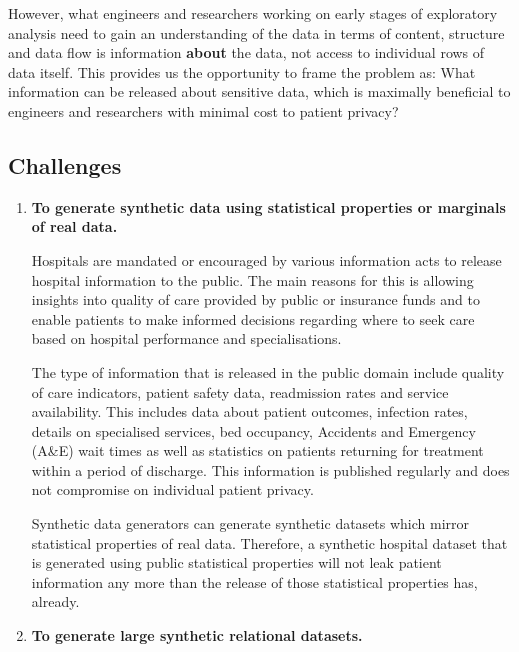 \documentclass[11pt]{article}
\begin{document}
However, what engineers and researchers working on early stages of exploratory analysis need to gain an understanding of the data in terms of content, structure and data flow is information \textbf{about} the data, not access to individual rows of data itself. This provides us the opportunity to frame the problem as: What information can be released about sensitive data, which is maximally beneficial to engineers and researchers with minimal cost to patient privacy?

\subsection{Challenges}

\begin{enumerate}[leftmargin=*]
    \item \textbf{To generate synthetic data using statistical properties or marginals of real data.
    }
    
    Hospitals are mandated or encouraged by various information acts to release hospital information to the public. The main reasons for this is allowing insights into quality of care provided by public or insurance funds and to enable patients to make informed decisions regarding where to seek care based on hospital performance and specialisations\cite{Werner2005}. 

    The type of information that is released in the public domain include quality of care indicators, patient safety data, readmission rates and service availability. This includes data about patient outcomes, infection rates, details on specialised services, bed occupancy, Accidents and Emergency (A\&E) wait times as well as statistics on patients returning for treatment within a period of discharge. This information is published regularly and does not compromise on individual patient privacy.  

    Synthetic data generators can generate synthetic datasets which mirror statistical properties of real data. Therefore, a synthetic hospital dataset that is generated using public statistical properties will not leak patient information any more than the release of those statistical properties has, already. 
    

    \item \textbf{To generate large synthetic relational datasets.
    }
    

\end{enumerate}
\end{document}

